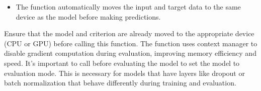 \documentclass[letterpaper,10pt,english]{sphinxmanual}
\begin{document}
\begin{fulllineitems}
\begin{description}
\begin{sphinxVerbatim}[commandchars=\\\{\}]
  
  
  
   
    
\end{sphinxVerbatim}

\begin{itemize}
\item {} 
\sphinxAtStartPar
The function automatically moves the input and target data to the same device as the model before making predictions.

\end{itemize}

\sphinxAtStartPar
Ensure that the model and criterion are already moved to the appropriate device (CPU or GPU) before calling this function.
\sphinxhyphen{} The function uses  context manager to disable gradient computation during evaluation, improving memory
efficiency and speed.
\sphinxhyphen{} It’s important to call  before evaluating the model to set the model to evaluation mode. This is necessary
for models that have layers like dropout or batch normalization that behave differently during training and evaluation.

\end{description}

\end{fulllineitems}

\end{document}
